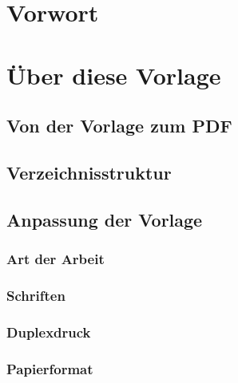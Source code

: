 \documentclass[twoside,a4paper,11pt,openright]{report}
\begin{document}



\tableofcontents
\listoffigures
\listoftables
\lstlistoflistings


\cleardoublepage
{}


\chapter*{Vorwort}



\chapter{Über diese Vorlage}
\label{sec:tpl}

\section{Von der Vorlage zum PDF}


\section{Verzeichnisstruktur}
\label{sec:tpl:dir}


\section{Anpassung der Vorlage}
\subsection{Art der Arbeit}


\subsection{Schriften}
\label{sec:tpl:font}


\subsection{Duplexdruck}


\clearpage
\subsection{Papierformat}

\end{document}

